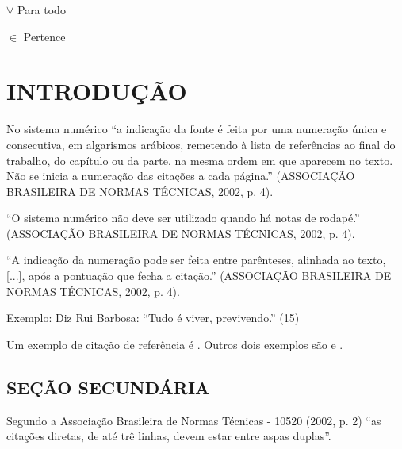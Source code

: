 \documentclass[
        12pt,
        openany, %
        oneside, %
        a4paper,			
        english,			
        brazil			        %
        ]{abntbibufjf}
\begin{document}
\begin{simbolos} %
  \item[$ \forall $] Para todo
  \item[$ \in $] Pertence
 \end{simbolos}

 
\tableofcontents*
\cleardoublepage



\textual
\pagestyle{simple}   


\chapter{INTRODU\c{C}\~AO}  %

No sistema num\'erico ``a indica\c{c}\~ao da fonte \'e feita por uma numera\c{c}\~ao \'unica e consecutiva, 
em algarismos ar\'abicos, remetendo \`a lista de refer\^encias ao final do trabalho, 
do cap\'itulo ou da parte, na mesma ordem em que aparecem no texto. 
N\~ao se inicia  a numera\c{c}\~ao das cita\c{c}\~oes a cada p\'agina.''
(ASSOCIA\c{C}\~AO BRASILEIRA DE NORMAS T\'ECNICAS, 2002, p. 4).

``O sistema num\'erico n\~ao deve ser utilizado quando h\'a notas de rodap\'e.'' 
(ASSOCIA\c{C}\~AO BRASILEIRA DE NORMAS T\'ECNICAS, 2002, p. 4).

``A indica\c{c}\~ao da numera\c{c}\~ao pode ser feita entre par\^enteses, alinhada ao texto, [...], 
ap\'os a pontua\c{c}\~ao que fecha a cita\c{c}\~ao.''
(ASSOCIA\c{C}\~AO BRASILEIRA DE NORMAS T\'ECNICAS, 2002, p. 4).
 
Exemplo: Diz Rui Barbosa: ``Tudo \'e viver, previvendo.''  (15) 

Um exemplo de cita\c{c}\~ao de refer\^encia \'e \cite{Ferrari2003}. Outros dois exemplos s\~ao \cite{CalcB} e 
\cite{Figueiredo96}.

\section{SE\c{C}\~AO SECUND\'ARIA} %

Segundo a Associa\c{c}\~ao Brasileira de Normas T\'ecnicas - 10520 (2002, p. 2) 
``as cita\c{c}\~oes diretas, de at\'e tr\^e linhas, devem estar entre aspas duplas''.
\end{document}
